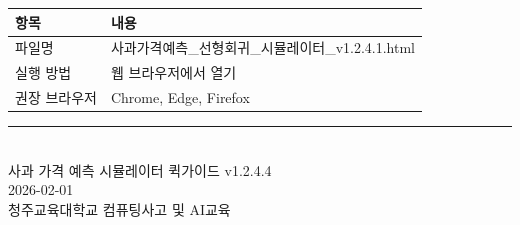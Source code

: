 \documentclass[11pt, a4paper]{article}
\begin{document}
\begin{center}
\begin{tabular}{lp{10cm}}
    \toprule
    \textbf{항목} & \textbf{내용} \\
    \midrule
    파일명 & 사과가격예측\_선형회귀\_시뮬레이터\_v1.2.4.1.html \\
    실행 방법 & 웹 브라우저에서 열기 \\
    권장 브라우저 & Chrome, Edge, Firefox \\
    \bottomrule
\end{tabular}
\end{center}

\vfill
\begin{center}
\rule{0.8\textwidth}{0.5pt}\\[0.3cm]
{\small\color{textmedium}
사과 가격 예측 시뮬레이터 퀵가이드 v1.2.4.4\\
2026-02-01\\
청주교육대학교 컴퓨팅사고 및 AI교육
}
\end{center}
\end{document}
